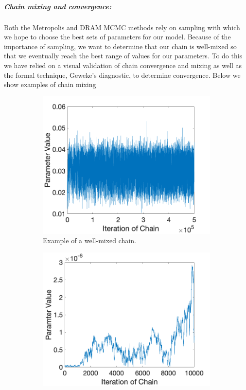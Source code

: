 \subparagraph{Chain mixing and convergence:} Both the Metropolis and DRAM MCMC methods rely on sampling with which we hope to choose the best sets of parameters for our model. Because of the importance of sampling, we want to determine that our chain is well-mixed so that we eventually reach the best range of values for our parameters. To do this we have relied on a visual validation of chain convergence and mixing as well as the formal technique, Geweke's diagnostic, to determine convergence. Below we show examples of chain mixing\\
\begin{figure}[H]
\begin{subfigure}{.5\textwidth}
  \centering
  \includegraphics[width=.8\linewidth]{MCMC_figs/chain_mix_ex1.png}
  \caption{Example of a well-mixed chain.}
  \label{fig:1a}
\end{subfigure}%
\begin{subfigure}{.5\textwidth}
  \centering
  \includegraphics[width=.8\linewidth]{MCMC_figs/chain_mix_ex2.png}

\end{subfigure}
\end{figure}
